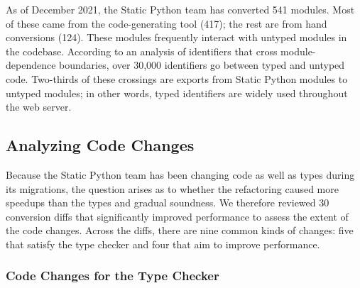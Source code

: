 \documentclass[english,cleveref,crc]{programming}
\newcommand{\SP}{Static Python}
\begin{document}
As of December 2021, the \SP{} team has converted 541 modules.
Most of these came from the code-generating tool (417); the rest
are from hand conversions (124).
These modules frequently interact with untyped modules in the codebase.
According to an analysis of identifiers that cross module-dependence
boundaries, over 30,000 identifiers go between typed and untyped code.
Two-thirds of these crossings are exports from \SP{} modules
to untyped modules; in other words, typed identifiers are widely used
throughout the web server.



\subsection{Analyzing Code Changes}
\label{s:code-changes}

Because the \SP{} team has been changing code as well as types during its
migrations, the question arises as to whether the refactoring caused
more speedups than the types and gradual soundness.
We therefore reviewed 30 conversion diffs that significantly improved
performance to assess the extent of the code changes.
Across the diffs, there are nine common kinds of changes: five that satisfy the
type checker and four that aim to improve performance.


\subsubsection{Code Changes for the Type Checker}
\label{s:behavior-changes}
\end{document}
